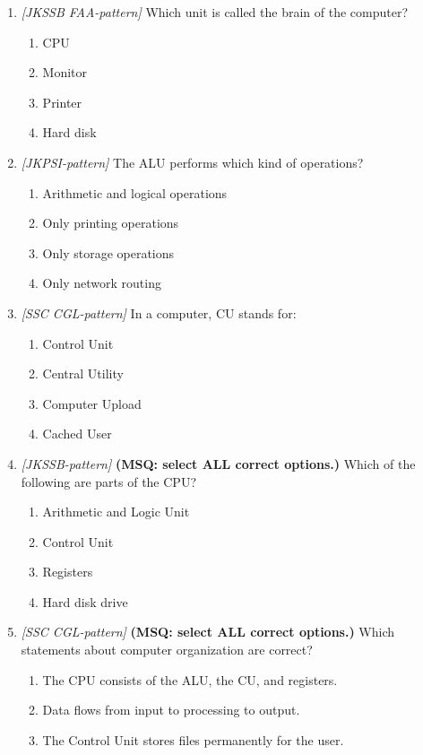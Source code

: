 \begin{enumerate}[label=\textbf{Q\arabic*.}, leftmargin=*]
\item \textit{[JKSSB FAA-pattern]} Which unit is called the brain of the computer?
  \begin{enumerate}[label=\Alph*.]
    \item CPU
    \item Monitor
    \item Printer
    \item Hard disk
  \end{enumerate}
\item \textit{[JKPSI-pattern]} The ALU performs which kind of operations?
  \begin{enumerate}[label=\Alph*.]
    \item Arithmetic and logical operations
    \item Only printing operations
    \item Only storage operations
    \item Only network routing
  \end{enumerate}
\item \textit{[SSC CGL-pattern]} In a computer, CU stands for:
  \begin{enumerate}[label=\Alph*.]
    \item Control Unit
    \item Central Utility
    \item Computer Upload
    \item Cached User
  \end{enumerate}
\item \textit{[JKSSB-pattern]} \textbf{(MSQ: select ALL correct options.)} Which of the following are parts of the CPU?
  \begin{enumerate}[label=\Alph*.]
    \item Arithmetic and Logic Unit
    \item Control Unit
    \item Registers
    \item Hard disk drive
  \end{enumerate}
\item \textit{[SSC CGL-pattern]} \textbf{(MSQ: select ALL correct options.)} Which statements about computer organization are correct?
  \begin{enumerate}[label=\Alph*.]
    \item The CPU consists of the ALU, the CU, and registers.
    \item Data flows from input to processing to output.
    \item The Control Unit stores files permanently for the user.

\end{enumerate}
\end{enumerate}
